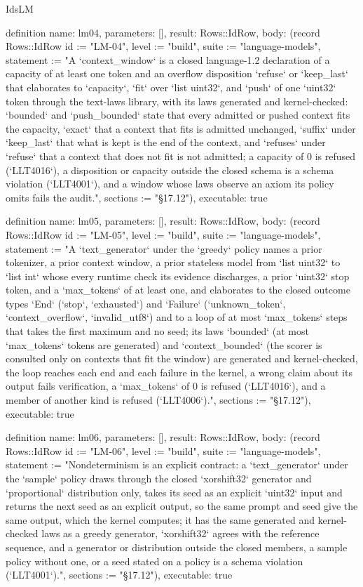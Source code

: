 \begin{lexlean}{IdsLM}
\begin{semanticmodule}
definition{
  name: lm04,
  parameters: [],
  result: Rows::IdRow,
  body: (record Rows::IdRow {id := "LM-04", level := "build", suite := "language-models", statement := "A `context_window` is a closed language-1.2 declaration of a capacity of at least one token and an overflow disposition `refuse` or `keep_last` that elaborates to `capacity`, `fit` over `list uint32`, and `push` of one `uint32` token through the text-laws library, with its laws generated and kernel-checked: `bounded` and `push_bounded` state that every admitted or pushed context fits the capacity, `exact` that a context that fits is admitted unchanged, `suffix` under `keep_last` that what is kept is the end of the context, and `refuses` under `refuse` that a context that does not fit is not admitted; a capacity of 0 is refused (`LLT4016`), a disposition or capacity outside the closed schema is a schema violation (`LLT4001`), and a window whose laws observe an axiom its policy omits fails the audit.", sections := "§17.12"}),
  executable: true
}

definition{
  name: lm05,
  parameters: [],
  result: Rows::IdRow,
  body: (record Rows::IdRow {id := "LM-05", level := "build", suite := "language-models", statement := "A `text_generator` under the `greedy` policy names a prior tokenizer, a prior context window, a prior stateless model from `list uint32` to `list int` whose every runtime check its evidence discharges, a prior `uint32` stop token, and a `max_tokens` of at least one, and elaborates to the closed outcome types `End` (`stop`, `exhausted`) and `Failure` (`unknown_token`, `context_overflow`, `invalid_utf8`) and to a loop of at most `max_tokens` steps that takes the first maximum and no seed; its laws `bounded` (at most `max_tokens` tokens are generated) and `context_bounded` (the scorer is consulted only on contexts that fit the window) are generated and kernel-checked, the loop reaches each end and each failure in the kernel, a wrong claim about its output fails verification, a `max_tokens` of 0 is refused (`LLT4016`), and a member of another kind is refused (`LLT4006`).", sections := "§17.12"}),
  executable: true
}

definition{
  name: lm06,
  parameters: [],
  result: Rows::IdRow,
  body: (record Rows::IdRow {id := "LM-06", level := "build", suite := "language-models", statement := "Nondeterminism is an explicit contract: a `text_generator` under the `sample` policy draws through the closed `xorshift32` generator and `proportional` distribution only, takes its seed as an explicit `uint32` input and returns the next seed as an explicit output, so the same prompt and seed give the same output, which the kernel computes; it has the same generated and kernel-checked laws as a greedy generator, `xorshift32` agrees with the reference sequence, and a generator or distribution outside the closed members, a sample policy without one, or a seed stated on a policy is a schema violation (`LLT4001`).", sections := "§17.12"}),
  executable: true
}


\end{semanticmodule}
\end{lexlean}

